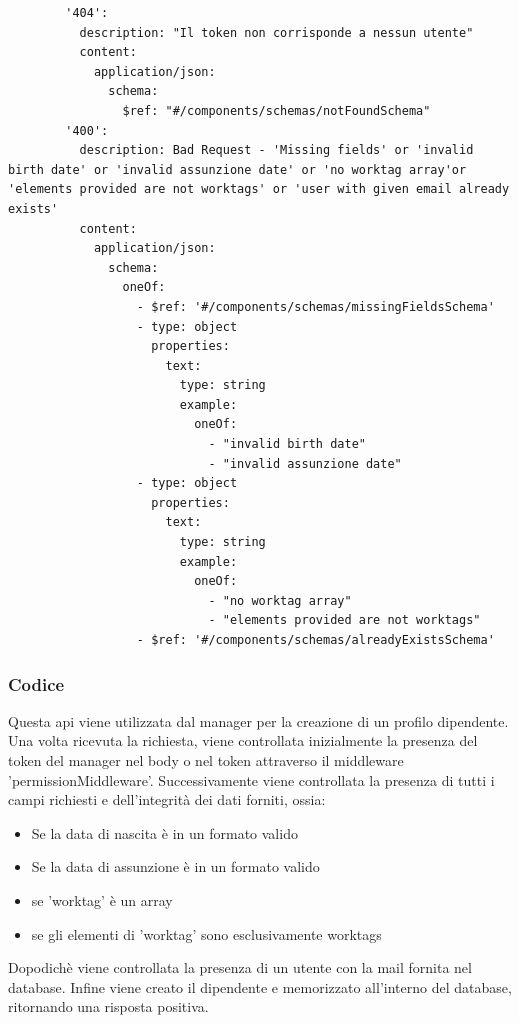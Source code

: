 \documentclass{report}
\begin{document}
\begin{verbatim}
        '404':
          description: "Il token non corrisponde a nessun utente"
          content:
            application/json:
              schema:
                $ref: "#/components/schemas/notFoundSchema"
        '400':
          description: Bad Request - 'Missing fields' or 'invalid birth date' or 'invalid assunzione date' or 'no worktag array'or 'elements provided are not worktags' or 'user with given email already exists'
          content:
            application/json:
              schema:
                oneOf:
                  - $ref: '#/components/schemas/missingFieldsSchema'
                  - type: object
                    properties:
                      text:
                        type: string
                        example: 
                          oneOf:
                            - "invalid birth date"
                            - "invalid assunzione date"
                  - type: object
                    properties:
                      text:
                        type: string
                        example:
                          oneOf:
                            - "no worktag array"
                            - "elements provided are not worktags"
                  - $ref: '#/components/schemas/alreadyExistsSchema'
\end{verbatim}
\subsubsection*{Codice}
Questa api viene utilizzata dal manager per la creazione di un profilo dipendente.
Una volta ricevuta la richiesta, viene controllata inizialmente la presenza del token del manager nel body o nel token attraverso il middleware 'permissionMiddleware'.
Successivamente viene controllata la presenza di tutti i campi richiesti e dell'integrità dei dati forniti, ossia:
\begin{itemize}
	\item Se la data di nascita è in un formato valido
	\item Se la data di assunzione è in un formato valido
	\item se 'worktag' è un array
	\item se gli elementi di 'worktag' sono esclusivamente worktags
\end{itemize}
Dopodichè viene controllata la presenza di un utente con la mail fornita nel database.
Infine viene creato il dipendente e memorizzato all'interno del database, ritornando una risposta positiva.
\end{document}
